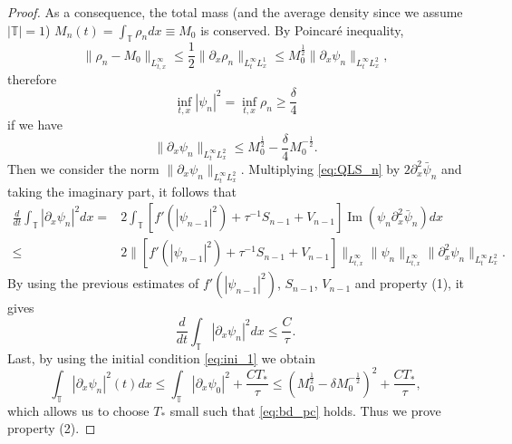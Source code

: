 \documentclass[leqno]{amsart}
\theoremstyle{plain}
\theoremstyle{definition}
\theoremstyle{remark}
\theoremstyle{plain}
\theoremstyle{plain}
\def\T{{\mathbb T}}%
\def\d{{\partial}}
\DeclareMathOperator{\IM}{Im}
\numberwithin{equation}{section}
\begin{document}
\begin{proof}
As a consequence, the total mass (and the average density since we assume $|\T|=1$) $M_n(t)=\int_\T\rho_n dx\equiv M_0$ is conserved. By Poincar\'e inequality,
\begin{equation}\label{eq:poincare}
\|\rho_n-M_0\|_{L^\infty_{t,x}}\leq \frac12\|\d_x\rho_n\|_{L^\infty_tL^1_x}\leq M_0^\frac12\|\d_x\psi_n\|_{L^\infty_tL^2_x},
\end{equation}
therefore 
\[
\inf_{t,x}|\psi_n|^2=\inf_{t,x}\rho_n\geq \frac{\delta}{4}
\]
if we have
\begin{equation}\label{eq:bd_pc}
\|\d_x\psi_n\|_{L^\infty_tL^2_x}\leq M_0^\frac12-\frac{\delta}{4}M_0^{-\frac12}.
\end{equation}
Then we consider the norm $\|\d_x\psi_n\|_{L^\infty_tL^2_x}$. Multiplying \eqref{eq:QLS_n} by $2\d_x^2\bar\psi_n$ and taking the imaginary part, it follows that
\begin{align*}
\frac{d}{dt}\int_\T|\d_x\psi_n|^2dx=&2\int_\T[f'(|\psi_{n-1}|^2)+\tau^{-1}S_{n-1}+V_{n-1}]\IM(\psi_n\d_x^2\bar\psi_n)dx\\
\leq & 2\|[f'(|\psi_{n-1}|^2)+\tau^{-1}S_{n-1}+V_{n-1}]\|_{L^\infty_{t,x}}\|\psi_n\|_{L^\infty_{t,x}}\|\d_x^2\psi_n\|_{L^\infty_tL^2_x}.
\end{align*}
By using the previous estimates of $f'(|\psi_{n-1}|^2)$, $S_{n-1}$, $V_{n-1}$ and property (1), it gives
\[
\frac{d}{dt}\int_\T|\d_x\psi_n|^2dx\leq \frac{C}{\tau}.
\]
Last, by using the initial condition \eqref{eq:ini_1} we obtain
\[
\int_\T|\d_x\psi_n|^2(t)dx\leq \int_\T|\d_x\psi_0|^2+\frac{CT_*}{\tau}\leq (M_0^\frac12-\delta M_0^{-\frac12})^2+\frac{CT_*}{\tau},
\]
which allows us to choose $T_*$ small such that \eqref{eq:bd_pc} holds. Thus we prove property (2). 


\end{proof}
\end{document}
